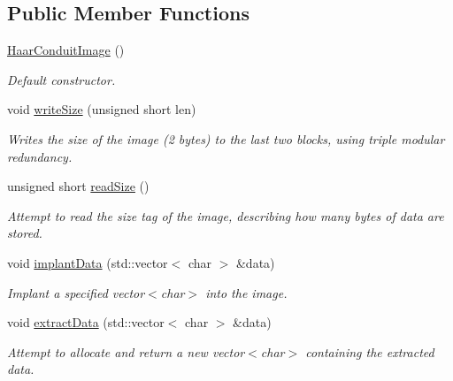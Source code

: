 \subsection*{Public Member Functions}
\begin{DoxyCompactItemize}
\item 
\hyperlink{classefb_1_1HaarConduitImage_af7fc5c1f79d83384ccdefea6b867ac2e}{HaarConduitImage} ()
\begin{DoxyCompactList}\small\item\em Default constructor. \item\end{DoxyCompactList}\item 
void \hyperlink{classefb_1_1HaarConduitImage_a1ffe316d6387cb21689ede4f06c44500}{writeSize} (unsigned short len)
\begin{DoxyCompactList}\small\item\em Writes the size of the image (2 bytes) to the last two blocks, using triple modular redundancy. \item\end{DoxyCompactList}\item 
unsigned short \hyperlink{classefb_1_1HaarConduitImage_a5e272ba12218188cba439255dea9df40}{readSize} ()
\begin{DoxyCompactList}\small\item\em Attempt to read the size tag of the image, describing how many bytes of data are stored. \item\end{DoxyCompactList}\item 
void \hyperlink{classefb_1_1HaarConduitImage_a722f5510d5b87afd72222afed3f77d34}{implantData} (std::vector$<$ char $>$ \&data)
\begin{DoxyCompactList}\small\item\em Implant a specified vector$<$char$>$ into the image. \item\end{DoxyCompactList}\item 
void \hyperlink{classefb_1_1HaarConduitImage_a34b2b3ff92ddfea24ccd0c1b6786152c}{extractData} (std::vector$<$ char $>$ \&data)
\begin{DoxyCompactList}\small\item\em Attempt to allocate and return a new vector$<$char$>$ containing the extracted data. \item\end{DoxyCompactList}\end{DoxyCompactItemize}
